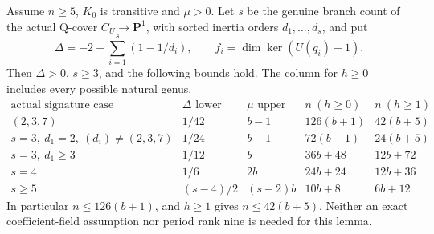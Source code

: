 \begin{lemma}[HD-SS08]
Assume \(n\ge5\), \(K_0\) is transitive and \(\mu>0\).
Let \(s\) be the genuine branch count of the actual
Q-cover \(C_U\to\mathbf P^1\), with sorted inertia orders
\(d_1,\ldots,d_s\), and put
\[
 \Delta=-2+\sum_{i=1}^s(1-1/d_i),\qquad
 f_i=\dim\ker(U(q_i)-1).
 \tag{SH.2}
\]
Then \(\Delta>0\), \(s\ge3\), and the following bounds hold.
The column for \(h\ge0\) includes every possible natural genus.
\[
\begin{array}{c|c|c|c|c}
\text{actual signature case}&\Delta\text{ lower bound}
 &\mu\text{ upper bound}&n\ (h\ge0)&n\ (h\ge1)\\ \hline
(2,3,7)&1/42&b-1&126(b+1)&42(b+5)\\
s=3,\ d_1=2,\ (d_i)\ne(2,3,7)&1/24&b-1&72(b+1)&24(b+5)\\
s=3,\ d_1\ge3&1/12&b&36b+48&12b+72\\
s=4&1/6&2b&24b+24&12b+36\\
s\ge5&(s-4)/2&(s-2)b&10b+8&6b+12
\end{array}                                             \tag{SH.3}
\]
In particular \(n\le126(b+1)\), and \(h\ge1\) gives
\(n\le42(b+5)\). Neither an exact coefficient-field assumption
nor period rank nine is needed for this lemma.
\end{lemma}

